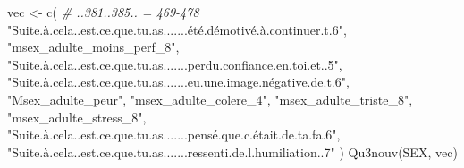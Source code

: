 \documentclass[
]{article}
\newenvironment{Shaded}{\begin{snugshade}}{\end{snugshade}}
\newcommand{\CommentTok}[1]{\textcolor[rgb]{0.56,0.35,0.01}{\textit{#1}}}
\newcommand{\FunctionTok}[1]{\textcolor[rgb]{0.00,0.00,0.00}{#1}}
\newcommand{\NormalTok}[1]{#1}
\newcommand{\OtherTok}[1]{\textcolor[rgb]{0.56,0.35,0.01}{#1}}
\newcommand{\StringTok}[1]{\textcolor[rgb]{0.31,0.60,0.02}{#1}}
\begin{document}
\begin{Shaded}
\begin{Highlighting}[]
\NormalTok{vec }\OtherTok{\textless{}{-}} \FunctionTok{c}\NormalTok{(  }\CommentTok{\# ..381..385.. = 469{-}478}
  \StringTok{"Suite.à.cela..est.ce.que.tu.as.......été.démotivé.à.continuer.t.6"}\NormalTok{,}
  \StringTok{"msex\_adulte\_moins\_perf\_8"}\NormalTok{,}
  \StringTok{"Suite.à.cela..est.ce.que.tu.as.......perdu.confiance.en.toi.et..5"}\NormalTok{,}
  \StringTok{"Suite.à.cela..est.ce.que.tu.as.......eu.une.image.négative.de.t.6"}\NormalTok{,}
  \StringTok{"Msex\_adulte\_peur"}\NormalTok{,}
  \StringTok{"msex\_adulte\_colere\_4"}\NormalTok{,}
  \StringTok{"msex\_adulte\_triste\_8"}\NormalTok{,}
  \StringTok{"msex\_adulte\_stress\_8"}\NormalTok{,}
  \StringTok{"Suite.à.cela..est.ce.que.tu.as.......pensé.que.c.était.de.ta.fa.6"}\NormalTok{,}
  \StringTok{"Suite.à.cela..est.ce.que.tu.as.......ressenti.de.l.humiliation..7"}
\NormalTok{  )}
\FunctionTok{Qu3nouv}\NormalTok{(SEX, vec)}
\end{Highlighting}
\end{Shaded}
\end{document}
